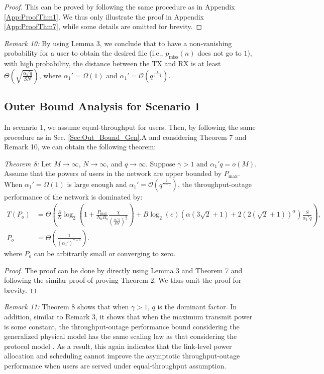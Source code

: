 \documentclass[journal,draftclsnofoot,onecolumn,12pt,twoside]{IEEEtran}
\begin{document}
\begin{proof}
This can be proved by following the same procedure as in Appendix \ref{App:ProofThm1}. We thus only illustrate the proof in Appendix \ref{App:ProofThm7}, while some details are omitted for brevity.
\end{proof}

{\em Remark 10:} By using Lemma 3, we conclude that to have a non-vanishing probability for a user to obtain the desired file (i.e., $p_{\text{miss}}(n)$ does not go to $1$), with high probability, the distance between the TX and RX is at least $\Theta\left(\sqrt{\frac{\alpha_1' q}{SN}}\right)$, where $\alpha_1'=\Omega(1)$ and $\alpha_1'=\mathcal{O}\left(q^{\frac{1}{\gamma-1}}\right)$.

\subsection{Outer Bound Analysis for Scenario 1} 

In scenario 1, we assume equal-throughput for users. Then, by following the same procedure as in Sec. \ref{Sec:Out_Bound_Gen}.A and considering Theorem 7 and Remark 10, we can obtain the following theorem:

{\em Theorem 8:} Let $M\to\infty$, $N\to\infty$, and $q\to\infty$. Suppose $\gamma>1$ and $\alpha_1'q=o(M)$. Assume that the powers of users in the network are upper bounded by $P_{\text{max}}$. When $\alpha_1'=\Omega(1)$ is large enough and $\alpha_1'=\mathcal{O}\left(q^{\frac{1}{\gamma-1}}\right)$, the throughput-outage performance of the network is dominated by:
\begin{equation}
\begin{aligned}
T(P_o)&= \Theta\left(\frac{B}{N}\log_2\left(1+\frac{P_{\text{max}}}{N_0B_{\text{s}}}\frac{\chi}{\left(\frac{\alpha_1'q}{SN}\right)^\frac{\alpha}{2}}\right)+B\log_2(e)\left(\alpha\left(3\sqrt{2}+1\right)+2(2(\sqrt{2}+1))^{\alpha}\right)\frac{S}{\alpha_1'q}\right),\\
P_o&= \Theta\left(\frac{1}{(\alpha_1')^{\gamma-1}}\right).
\end{aligned}
\end{equation}
where $P_o$ can be arbitrarily small or converging to zero.
\begin{proof}
The proof can be done by directly using Lemma 3 and Theorem 7 and following the similar proof of proving Theorem 2. We thus omit the proof for brevity.
\end{proof}

{\em Remark 11:} Theorem 8 shows that when $\gamma>1$, $q$ is the dominant factor. In addition, similar to Remark 3, it shows that when the maximum transmit power is some constant, the throughput-outage performance bound considering the generalized physical model has the same scaling law as that considering the protocol model \cite{lee2019throughput}. As a result, this again indicates that the link-level power allocation and scheduling cannot improve the asymptotic throughput-outage performance when users are served under equal-throughput assumption.
\end{document}
